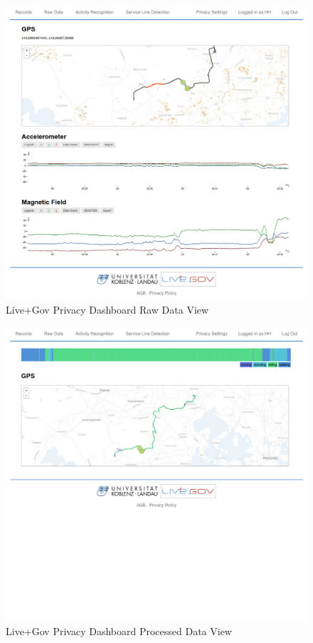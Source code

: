 \begin{figure}
\includegraphics[width=\textwidth]{screenshots/raw.png}
\caption{Live+Gov Privacy Dashboard Raw Data View}
\end{figure}

\begin{figure}
\includegraphics[width=\textwidth]{screenshots/processed.png}
\caption{Live+Gov Privacy Dashboard Processed Data View}
\end{figure}

